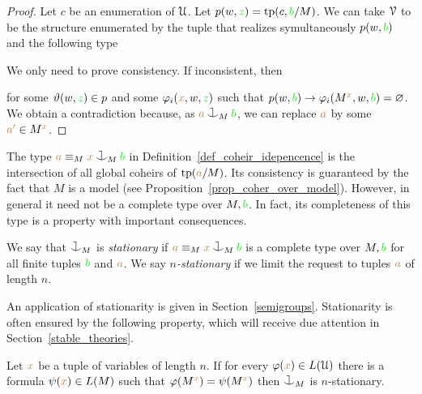 \begin{proof}
  Let $c$ be an enumeration of $\EuScript U$.
  Let $p(w,{\color{green} z})={\rm tp}(c,{\color{green} b}/M)$.
  We can take $\EuScript V$ to be the structure enumerated by the tuple that realizes symultaneously $p(w,{\color{green} b}) $ and the following type 


  We only need to prove consistency.
  If inconsistent, then 

  
  for some $\vartheta(w,{\color{green} z})\in p$ and some $\varphi_i({\color{brown} x},w,{\color{green} z})$ such that $p(w,{\color{green} b})\rightarrow\varphi_i(M^{\color{brown} x},w,{\color{green} b})=\varnothing$.
  We obtain a contradiction because, as ${\mr a}\cnonfork_M{\gr b}$, we can replace ${\color{brown} a}$ by some ${\color{brown} a'}\in M^{\color{brown} x}$.
\end{proof}


The type ${\mr a}\equiv_M{\mr x}\cnonfork_M{\gr b}$ in Definition~\ref{def_coheir_idepencence} is the intersection of all global coheirs of ${\rm tp}({\color{brown} a}/M)$.
%
Its consistency is guaranteed by the fact that $M$ is a model (see Proposition~\ref{prop_coher_over_model}).
%
However, in general it need not be a complete type over $M,{\color{green} b}$.
%
In fact, its completeness of this type is a property with important consequences.

\begin{definition}\label{def_coheir_stationary} We say that $\cnonfork_M$ is \emph{stationary\/} if ${\mr a}\equiv_M{\mr x}\cnonfork_M{\gr b}$ is a complete type over $M,{\color{green} b}$ for all finite tuples ${\color{green} b}$ and ${\color{brown} a}$.
We say \emph{$n$-stationary\/} if we limit the request to tuples ${\color{brown} a}$ of length $n$.
\end{definition}

An application of stationarity is given in Section~\ref{semigroups}.
Stationarity is often ensured by the following property, which will receive due attention in Section~\ref{stable_theories}.

\begin{proposition}\label{prop_stationarity}
Let ${\color{brown} x}$ be a tuple of variables of length $n$.
If for every $\varphi({\color{brown} x})\in L(\EuScript U)$ there is a formula $\psi({\color{brown} x})\in L(M)$ such that $\varphi(M^{\color{brown} x})=\psi(M^{\color{brown} x})$ then $\cnonfork_M$ is $n$-stationary.
\end{proposition}

